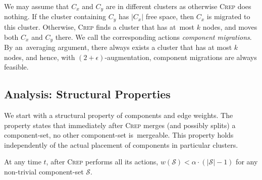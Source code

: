 \documentclass{siamart190516}
\newcommand{\CREP}{\textsc{Crep}\xspace}
\newcommand{\eps}{\ensuremath{\epsilon}}
\newcommand{\set}{\mathcal{S}}
\begin{document}
We may assume that $C_x$ and $C_y$ are in different clusters as otherwise
\CREP does nothing. If the cluster containing $C_y$ has $|C_x|$ free space,
then $C_x$ is migrated to this cluster. Otherwise, \CREP finds a cluster that
has at~most $k$ nodes, and moves both $C_x$ and $C_y$ there. We call the
corresponding actions \emph{component migrations}. By an~averaging argument,
there always exists a cluster that has at most $k$ nodes, and hence, with
$(2+\eps)$-augmentation, component migrations are always feasible.


\subsection{Analysis: Structural Properties}

We start with a structural property of components and edge weights.
The property states that immediately after \CREP merges (and
possibly splits) a component-set, no other component-set is~mergeable. This
property holds independently of the actual placement of components in
particular clusters.

\begin{lemma}
\label{lem:wS_bound}
At any time $t$, after \CREP performs all its actions,
$w(\set) < \alpha \cdot (|\set|-1)$ for any non-trivial component-set $\set$.
\end{lemma}
\end{document}
